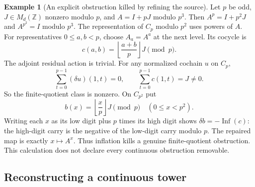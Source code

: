 \documentclass[11pt]{article}
\theoremstyle{definition}
\newtheorem{example}[theorem]{Example}
\theoremstyle{remark}
\begin{document}
\begin{example}[An explicit obstruction killed by refining the source]\label{ex:inflation-carry}
Let $p$ be odd, $J\in M_d(\mathbb Z)$ nonzero modulo $p$, and $A=I+pJ$ modulo $p^3$. Then $A^p=I+p^2J$ and $A^{p^2}=I$ modulo $p^3$. The representation of $C_p$ modulo $p^2$ uses powers of $A$. For representatives $0\leq a,b<p$, choose $A_a=A^a$ at the next level. Its cocycle is
\[
 c(a,b)=\left\lfloor\frac{a+b}{p}\right\rfloor J\pmod p.
\]
The adjoint residual action is trivial. For any normalized cochain $u$ on $C_p$,
\[
 \sum_{t=0}^{p-1}(\delta u)(1,t)=0,
 \qquad\sum_{t=0}^{p-1}c(1,t)=J\ne0.
\]
So the finite-quotient class is nonzero. On $C_{p^2}$ put
\[
 b(x)=\left\lfloor\frac{x}{p}\right\rfloor J\pmod p
 \quad(0\leq x<p^2).
\]
Writing each $x$ as its low digit plus $p$ times its high digit shows
$\delta b=-\operatorname{Inf}(c)$: the high-digit carry is the negative of the low-digit carry modulo $p$. The repaired map is exactly $x\mapsto A^x$. Thus inflation kills a genuine finite-quotient obstruction. This calculation does not declare every continuous obstruction removable.
\end{example}

\subsection{Reconstructing a continuous tower}
\end{document}
